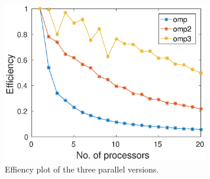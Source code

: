 \begin{figure}[h!]
\centering
\includegraphics[width = 0.8\textwidth]{fig/efficiency_omp_omp2_omp3.eps}
\caption{Effiency plot of the three parallel versions.}
\label{fig:omp_eff}
\end{figure}

